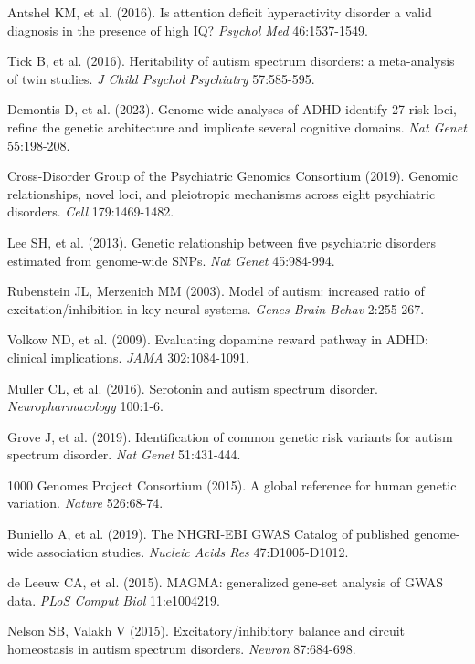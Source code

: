 \documentclass[12pt,letterpaper]{article}
\theoremstyle{definition}
\theoremstyle{remark}
\begin{document}
\begin{thebibliography}{99}

Antshel KM, et al. (2016). Is attention deficit hyperactivity disorder a valid diagnosis in the presence of high IQ? \textit{Psychol Med} 46:1537-1549.

Tick B, et al. (2016). Heritability of autism spectrum disorders: a meta-analysis of twin studies. \textit{J Child Psychol Psychiatry} 57:585-595.

Demontis D, et al. (2023). Genome-wide analyses of ADHD identify 27 risk loci, refine the genetic architecture and implicate several cognitive domains. \textit{Nat Genet} 55:198-208.

Cross-Disorder Group of the Psychiatric Genomics Consortium (2019). Genomic relationships, novel loci, and pleiotropic mechanisms across eight psychiatric disorders. \textit{Cell} 179:1469-1482.

Lee SH, et al. (2013). Genetic relationship between five psychiatric disorders estimated from genome-wide SNPs. \textit{Nat Genet} 45:984-994.

Rubenstein JL, Merzenich MM (2003). Model of autism: increased ratio of excitation/inhibition in key neural systems. \textit{Genes Brain Behav} 2:255-267.

Volkow ND, et al. (2009). Evaluating dopamine reward pathway in ADHD: clinical implications. \textit{JAMA} 302:1084-1091.

Muller CL, et al. (2016). Serotonin and autism spectrum disorder. \textit{Neuropharmacology} 100:1-6.

Grove J, et al. (2019). Identification of common genetic risk variants for autism spectrum disorder. \textit{Nat Genet} 51:431-444.

1000 Genomes Project Consortium (2015). A global reference for human genetic variation. \textit{Nature} 526:68-74.

Buniello A, et al. (2019). The NHGRI-EBI GWAS Catalog of published genome-wide association studies. \textit{Nucleic Acids Res} 47:D1005-D1012.

de Leeuw CA, et al. (2015). MAGMA: generalized gene-set analysis of GWAS data. \textit{PLoS Comput Biol} 11:e1004219.

Nelson SB, Valakh V (2015). Excitatory/inhibitory balance and circuit homeostasis in autism spectrum disorders. \textit{Neuron} 87:684-698.


\end{thebibliography}
\end{document}

